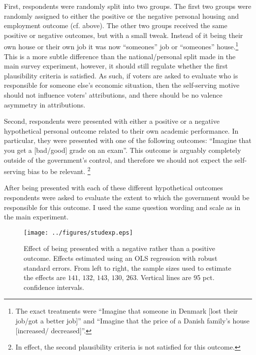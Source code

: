 \documentclass[a4paper,11pt]{article}
\begin{document}
	First, respondents were randomly split into two groups. The first two groups were randomly assigned to either the positive or the negative personal housing and employment outcome (cf. above). The other two groups received the same positive or negative outcomes, but with a small tweak. Instead of it being their own house or their own job it was now ``someones'' job or ``someones'' house.\footnote{The exact treatments were ``Imagine that someone in Denmark [lost their job/got a better job]'' and ``Imagine that the price of a Danish family's house [increased/ decreased]''.} This is a more subtle difference than the national/personal split made in the main survey experiment, however, it should still regulate whether the first plausibility criteria is satisfied. As such, if voters are asked to evaluate who is responsible for someone else's economic situation, then the self-serving motive should not influence voters' attributions, and there should be no valence asymmetry in attributions.
	
	Second, respondents were presented with either a positive or a negative hypothetical personal outcome related to their own academic performance. In particular, they were presented with one of the following outcomes: ``Imagine that you get a [bad/good] grade on an exam''. This outcome is arguably completely outside of the government's control, and therefore we should not expect the self-serving bias to be relevant. \footnote{In effect, the second plausibility criteria is not satisfied for this outcome.}
	
	After being presented with each of these different hypothetical outcomes respondents were asked to evaluate the extent to which the government would be responsible for this outcome. I used the same question wording and scale as in the main experiment.  
	
	
	
	\begin{figure}
		\centering 
		\texttt{[image: ../figures/studexp.eps]}
		\caption{Effect of being presented with a negative rather than a positive outcome. Effects estimated using  an OLS regression with robust standard errors. From left to right, the sample sizes used to estimate the effects are $141$, $132$, $143$, $130$, $263$. Vertical lines are 95 pct. confidence intervals.} \label{studexperiment}
	\end{figure}
	
\end{document}
